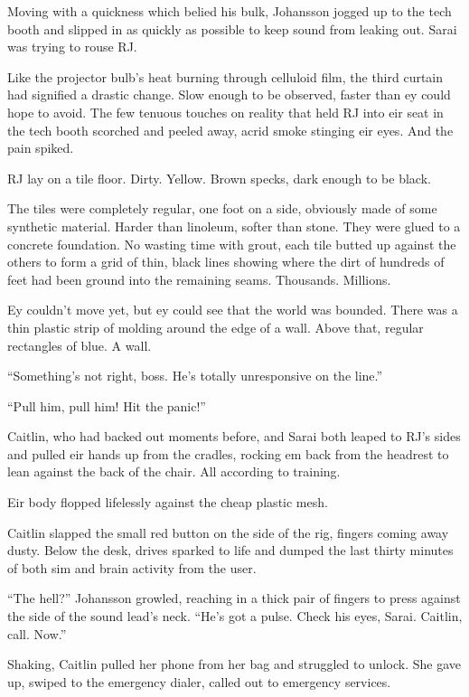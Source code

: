 Moving with a quickness which belied his bulk, Johansson jogged up to the tech booth and slipped in as quickly as possible to keep sound from leaking out. Sarai was trying to rouse RJ.

Like the projector bulb's heat burning through celluloid film, the third curtain had signified a drastic change. Slow enough to be observed, faster than ey could hope to avoid. The few tenuous touches on reality that held RJ into eir seat in the tech booth scorched and peeled away, acrid smoke stinging eir eyes. And the pain spiked.

RJ lay on a tile floor. Dirty. Yellow. Brown specks, dark enough to be black.

The tiles were completely regular, one foot on a side, obviously made of some synthetic material. Harder than linoleum, softer than stone. They were glued to a concrete foundation. No wasting time with grout, each tile butted up against the others to form a grid of thin, black lines showing where the dirt of hundreds of feet had been ground into the remaining seams. Thousands. Millions.

Ey couldn't move yet, but ey could see that the world was bounded. There was a thin plastic strip of molding around the edge of a wall. Above that, regular rectangles of blue. A wall.

``Something's not right, boss. He's totally unresponsive on the line.''

``Pull him, pull him! Hit the panic!''

Caitlin, who had backed out moments before, and Sarai both leaped to RJ's sides and pulled eir hands up from the cradles, rocking em back from the headrest to lean against the back of the chair. All according to training.

Eir body flopped lifelessly against the cheap plastic mesh.

Caitlin slapped the small red button on the side of the rig, fingers coming away dusty. Below the desk, drives sparked to life and dumped the last thirty minutes of both sim and brain activity from the user.

``The hell?'' Johansson growled, reaching in a thick pair of fingers to press against the side of the sound lead's neck. ``He's got a pulse. Check his eyes, Sarai. Caitlin, call. Now.''

Shaking, Caitlin pulled her phone from her bag and struggled to unlock. She gave up, swiped to the emergency dialer, called out to emergency services.

